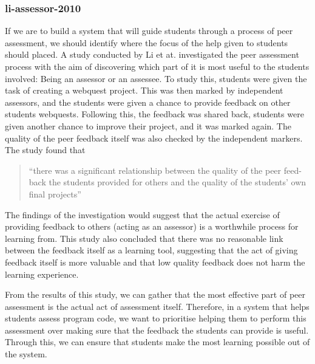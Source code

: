 \documentclass[a4paper,11pt]{report}
\begin{document}
\subsubsection{li-assessor-2010}
If we are to build a system that will guide students through a process of peer assessment, we should identify where the focus of the help given to students should placed. A study conducted by Li et at. \cite{li_assessor_2010} investigated the peer assessment process with the aim of discovering which part of it is most useful to the students involved: Being an assessor or an assessee. To study this, students were given the task of creating a webquest project. This was then marked by independent assessors, and the students were given a chance to provide feedback on other students webquests. Following this, the feedback was shared back, students were given another chance to improve their project, and it was marked again. The quality of the peer feedback itself was also checked by the independent markers. The study found that 
\begin{quote}
``there was a significant relationship between the quality of the peer feed-back the students provided for others and the quality of the students' own final projects''
\end{quote}
The findings of the investigation would suggest that the actual exercise of providing feedback to others (acting as an assessor) is a worthwhile process for learning from. This study also concluded that there was no reasonable link between the feedback itself as a learning tool, suggesting that the act of giving feedback itself is more valuable and that low quality feedback does not harm the learning experience.\par
From the results of this study, we can gather that the most effective part of peer assessment is the actual act of assessment itself. Therefore, in a system that helps students assess program code, we want to prioritise helping them to perform this assessment over making sure that the feedback the students can provide is useful. Through this, we can ensure that students make the most learning possible out of the system.
\end{document}
